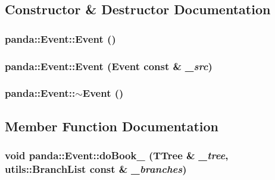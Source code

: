 \subsection{Constructor \& Destructor Documentation}
\hypertarget{classpanda_1_1Event_afa0708d0da41a890950b73745b679c8f}{
\subsubsection[{Event}]{\setlength{\rightskip}{0pt plus 5cm}panda::Event::Event ()}}
\label{classpanda_1_1Event_afa0708d0da41a890950b73745b679c8f}
\hypertarget{classpanda_1_1Event_ab444c3beac70a3b85dbb86134cc8456a}{
\subsubsection[{Event}]{\setlength{\rightskip}{0pt plus 5cm}panda::Event::Event ({\bf Event} const \& {\em \_\-src})}}
\label{classpanda_1_1Event_ab444c3beac70a3b85dbb86134cc8456a}
\hypertarget{classpanda_1_1Event_a7519b814d0f3d3beb8c68aca49e14d61}{
\subsubsection[{$\sim$Event}]{\setlength{\rightskip}{0pt plus 5cm}panda::Event::$\sim$Event ()}}
\label{classpanda_1_1Event_a7519b814d0f3d3beb8c68aca49e14d61}


\subsection{Member Function Documentation}
\hypertarget{classpanda_1_1Event_a3c20f40e1f37f947a5e977c38c53febb}{
\subsubsection[{doBook\_\-}]{\setlength{\rightskip}{0pt plus 5cm}void panda::Event::doBook\_\- (TTree \& {\em \_\-tree}, \/  {\bf utils::BranchList} const \& {\em \_\-branches})}}
\label{classpanda_1_1Event_a3c20f40e1f37f947a5e977c38c53febb}


